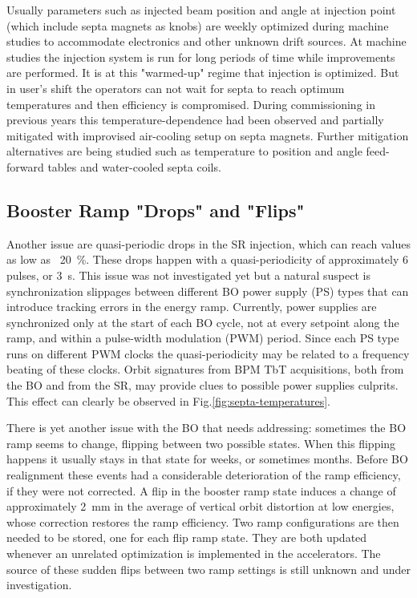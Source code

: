\documentclass[a4paper,
               keeplastbox,   %
               ]{jacow}
\begin{document}
Usually parameters such as injected beam position and angle at injection point (which include septa magnets as knobs) are weekly optimized during machine studies to accommodate electronics and other unknown drift sources. At machine studies the injection system is run for long periods of time while improvements are performed. It is at this "warmed-up" regime that injection is optimized. But in user's shift the operators can not wait for septa to reach optimum temperatures and then efficiency is compromised. During commissioning in previous years this temperature-dependence had been observed and partially mitigated with improvised air-cooling setup on septa magnets. Further mitigation alternatives are being studied such as temperature to position and angle feed-forward tables and water-cooled septa coils.

\subsection{Booster Ramp "Drops" and "Flips"}

Another issue are quasi-periodic drops in the SR injection, which can reach values as low as ~\SI{20}{\percent}. These drops happen with a quasi-periodicity of approximately 6 pulses, or \SI{3}{\second}. This issue was not investigated yet but a natural suspect is synchronization slippages between different BO power supply (PS) types that can introduce tracking errors in the energy ramp. Currently, power supplies are synchronized only at the start of each BO cycle, not at every setpoint along the ramp, and within a pulse-width modulation (PWM) period. Since each PS type runs on different PWM clocks the quasi-periodicity may be related to a frequency beating of these clocks. Orbit signatures from BPM TbT acquisitions, both from the BO and from the SR, may provide clues to possible power supplies culprits. This effect can clearly be observed in Fig.\ref{fig:septa-temperatures}.

There is yet another issue with the BO that needs addressing: sometimes the BO ramp seems to change, flipping between two possible states. When this flipping happens it usually stays in that state for weeks, or sometimes months. Before BO realignment these events had a considerable deterioration of the ramp efficiency, if they were not corrected. A flip in the booster ramp state induces a change of approximately \SI{2}{\milli\meter} in the average of vertical orbit distortion at low energies, whose correction restores the ramp efficiency. Two ramp configurations are then needed to be stored, one for each flip ramp state. They are both updated whenever an unrelated optimization is implemented in the accelerators. The source of these sudden flips between two ramp settings is still unknown and under investigation.
\end{document}
